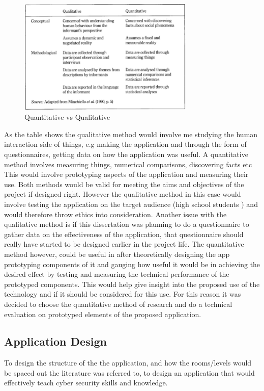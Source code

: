 \documentclass[12pt,a4paper]{article}
\begin{document}
\begin{figure}[!hb]
    \centering
    \includegraphics[width=0.75\textwidth]{Figs/research.PNG} 
    \caption{Quantitative vs Qualitative} 
    \label{Research}
\end{figure}  

As the table shows the qualitative method would involve me studying the human interaction side of things, e.g making the application and through the form of questionnaires, getting data on how the application was useful. A quantitative method involves measuring things, numerical comparisons, discovering facts etc This would involve prototyping aspects of the application and measuring their use. Both methods would be valid for meeting the aims and objectives of the project if designed right. However the qualitative method in this case would involve testing the application on the target audience (high school students 
) and would therefore throw ethics into consideration. Another issue with the qualitative method is if this dissertation was planning to do a questionnaire to gather data on the effectiveness of the application, that questionnaire should really have  started to be designed earlier in the project life. The quantitative method however, could be useful in after theoretically designing the app prototyping components of it and gauging how useful it would be in achieving the desired effect by testing and measuring the technical performance of the prototyped components. This would help give insight into the proposed use of the technology and if it should be considered for this use. For this reason it was decided to choose the quantitative method of research and do a technical evaluation on prototyped elements of the proposed application.


\subsection{Application Design}  
To design the structure of the the application, and how the rooms/levels would be spaced out the literature was referred to, to design an application that would effectively teach cyber security skills and knowledge. 
\end{document}
